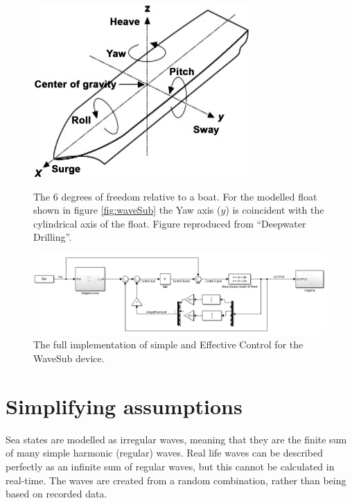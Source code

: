 \documentclass{report}
\begin{document}
\begin{figure}[b]
\includegraphics{graphics/dimensionsPic}
\centering
\label{dimensionsPic}
\caption{The 6 degrees of freedom relative to a boat. For the modelled float shown in figure \ref{fig:waveSub} the Yaw axis ($y$) is coincident with the cylindrical axis of the float. Figure reproduced from ``Deepwater Drilling''\cite{dimensionsPic}.}
\end{figure}

\begin{figure}[t]
\label{fig:fullControl}
\hspace{-2cm}
\includegraphics[scale=0.6]{graphics/fullControlSystem}
\caption{The full implementation of simple and Effective Control for the WaveSub device.}
\end{figure}

\FloatBarrier


\section{Simplifying assumptions}
\label{section:assumptions}

Sea states are modelled as irregular waves, meaning that they are the finite sum of many simple harmonic (regular) waves. Real life waves can be described perfectly as an infinite sum of regular waves, but this cannot be calculated in real-time. The waves are created from a random combination, rather than being based on recorded data.
\end{document}
